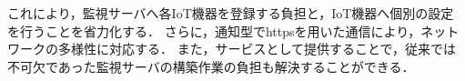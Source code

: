 これにより，監視サーバへ各IoT機器を登録する負担と，IoT機器へ個別の設定を行うことを省力化する．
さらに，通知型でhttpsを用いた通信により，ネットワークの多様性に対応する．
また，サービスとして提供することで，従来では不可欠であった監視サーバの構築作業の負担も解決することができる．

